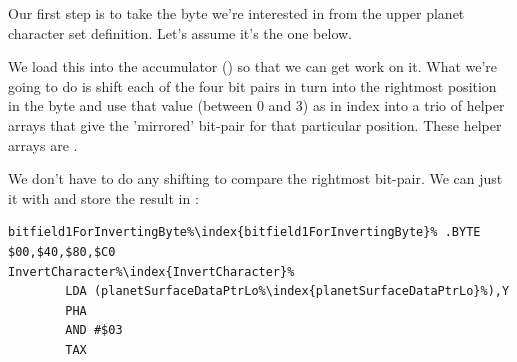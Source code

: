 Our first step is to take the byte we're interested in from the upper planet character set
definition. Let's assume it's the one below.

\begin{figure}[H]
  {
    \setlength{\tabcolsep}{3.0pt}
    \setlength\cmidrulewidth{\lightrulewidth} %
    \begin{adjustbox}{width=4cm,center}
    \end{adjustbox}
  }
\end{figure}

We load this into the accumulator () so that we can get work on it. What we're going to
do is shift each of the four bit pairs in turn into the rightmost position in the byte and use
that value (between 0 and 3) as in index into a trio of helper arrays that give the 'mirrored'
bit-pair for that particular position. These helper arrays are .

We don't have to do any shifting to compare the rightmost bit-pair. We can just  it with
 and store the result in :

\begin{lstlisting}[escapechar=\%]
bitfield1ForInvertingByte%\index{bitfield1ForInvertingByte}% .BYTE $00,$40,$80,$C0
InvertCharacter%\index{InvertCharacter}%
        LDA (planetSurfaceDataPtrLo%\index{planetSurfaceDataPtrLo}%),Y
        PHA
        AND #$03
        TAX
\end{lstlisting}


